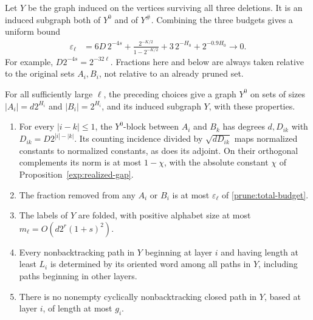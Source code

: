 Let \(Y\) be the graph induced on the vertices surviving all three
deletions.  It is an induced subgraph both of \(Y^0\) and of
\(Y^\#\).  Combining the three budgets gives a uniform bound
\begin{equation}
\begin{split}
 \varepsilon_\ell
 &=6D\,2^{-4s}
   +\frac{2^{-K/2}}{1-2^{-K/2}}
   +3\,2^{-H_0}+2^{-0.9H_0}\longrightarrow0.
\end{split}
\label{prune:total-budget}
\end{equation}
For example, \(D2^{-4s}=2^{-32\ell}\).  Fractions here and below
are always taken relative to the original sets \(A_i,B_i\), not
relative to an already pruned set.

\begin{proposition}
\label{prune:tower-properties}
For all sufficiently large \(\ell\), the preceding choices give a
graph \(Y^0\) on sets of sizes
\(|A_i|=d2^{H_i}\) and \(|B_i|=2^{H_i}\), and its induced
subgraph \(Y\), with these properties.
\begin{enumerate}
\item For every \(|i-k|\leq1\), the \(Y^0\)-block between
\(A_i\) and \(B_k\) has degrees \(d,D_{ik}\) with
\(D_{ik}=D2^{|i|-|k|}\).  Its counting incidence divided by
\(\sqrt{dD_{ik}}\) maps normalized constants to normalized
constants, as does its adjoint.  On their orthogonal complements its
norm is at most \(1-\chi\), with the absolute constant \(\chi\)
of Proposition~\ref{exp:realized-gap}.
\item The fraction removed from any \(A_i\) or \(B_i\) is at
most \(\varepsilon_\ell\) of \eqref{prune:total-budget}.
\item The labels of \(Y\) are folded, with positive alphabet size
at most \(m_\ell=O(d2^r(1+s)^2)\).
\item Every nonbacktracking path in \(Y\) beginning at layer \(i\)
and having length at least \(L_i\) is determined by its oriented
word among all paths in \(Y\), including paths beginning in other
layers.
\item There is no nonempty cyclically nonbacktracking closed path
in \(Y\), based at layer \(i\), of length at most \(g_i\).
\end{enumerate}
\end{proposition}

